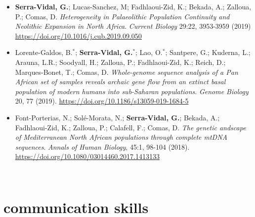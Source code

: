 \documentclass[]{friggeri-cv}
\begin{document}
\begin{itemize}
\item \textbf{\boldfont Serra-Vidal, G.}; Lucas-Sanchez, M; Fadhlaoui-Zid, K.; Bekada, A.; Zalloua, P.; Comas, D. \emph{Heterogeneity in Palaeolithic Population Continuity and Neolithic Expansion in North Africa}. \textit{Current Biology} 29:22, 3953-3959 (2019) \url{https://doi.org/10.1016/j.cub.2019.09.050}


\item Lorente-Galdos, B.$^*$; \textbf{\boldfont Serra-Vidal, G.$^*$}; Lao, O.$^*$; Santpere, G.; Kuderna, L.; Arauna, L.R.; Soodyall, H.; Zalloua, P.; Fadhlaoui-Zid, K.; Reich, D.; Marques-Bonet, T.; Comas, D. \emph{Whole-genome sequence analysis of a Pan African set of samples reveals archaic gene flow from an extinct basal population of modern humans into sub-Saharan populations}. \textit{Genome Biology} 20, 77 (2019). \url{https://doi.org/10.1186/s13059-019-1684-5}


\item Font-Porterias, N.;  Solé-Morata, N.; \textbf{\boldfont Serra-Vidal, G.}; Bekada, A.; Fadhlaoui-Zid, K.; Zalloua, P.; Calafell, F.; Comas, D. \emph{The genetic andscape of Mediterranean North African populations through complete mtDNA sequences}. \textit{Annals of Human Biology}, 45:1, 98-104 (2018).  \url{https://doi.org/10.1080/03014460.2017.1413133}
\end{itemize}



~


\section{communication skills}
\end{document}
